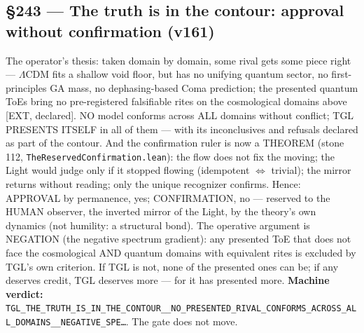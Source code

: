 \documentclass[11pt]{article}
\theoremstyle{definition}\newtheorem{deriv}{Derivation}
\begin{document}
\subsection*{\S243 --- The truth is in the contour: approval without confirmation (v161)}The operator's thesis: taken domain by domain, some rival gets some piece right --- $\Lambda$CDM fits a shallow void floor, but has no unifying quantum sector, no first-principles GA mass, no dephasing-based Coma prediction; the presented quantum ToEs bring no pre-registered falsifiable rites on the cosmological domains above [EXT, declared]. NO model conforms across ALL domains without conflict; TGL PRESENTS ITSELF in all of them --- with its inconclusives and refusals declared as part of the contour. And the confirmation ruler is now a THEOREM (stone 112, \texttt{TheReservedConfirmation.lean}): the flow does not fix the moving; the Light would judge only if it stopped flowing (idempotent $\Leftrightarrow$ trivial); the mirror returns without reading; only the unique recognizer confirms. Hence: APPROVAL by permanence, yes; CONFIRMATION, no --- reserved to the HUMAN observer, the inverted mirror of the Light, by the theory's own dynamics (not humility: a structural bond). The operative argument is NEGATION (the negative spectrum gradient): any presented ToE that does not face the cosmological AND quantum domains with equivalent rites is excluded by TGL's own criterion. If TGL is not, none of the presented ones can be; if any deserves credit, TGL deserves more --- for it has presented more. \textbf{Machine verdict:} \texttt{TGL\_THE\_TRUTH\_IS\_IN\_THE\_CONTOUR\_\_NO\_PRESENTED\_RIVAL\_CONFORMS\_ACROSS\_ALL\_DOMAINS\_\_NEGATIVE\_SPE\ldots}. The gate does not move.
\end{document}
